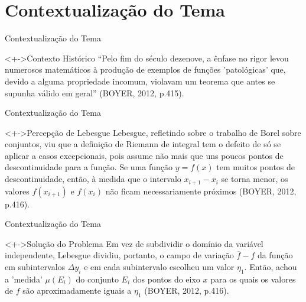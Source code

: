 
\AtBeginSection[]{
	\begin{frame}
		\frametitle{}
		\tableofcontents[currentsection]
	\end{frame}
}


	\section{Contextualização do Tema}
	\begin{frame}{Contextualização do Tema} %
		\begin{block}<+->{Contexto Histórico}
			\justify
			“Pelo fim do século dezenove, a ênfase no rigor levou numerosos matemáticos à produção de exemplos de funções ’patológicas’ que, devido a alguma propriedade incomum, violavam um teorema que antes se supunha válido em geral” (BOYER, 2012, p.415).
		\end{block}
	
	
	
	
	\end{frame} %
	
	\begin{frame}{Contextualização do Tema} %
		\begin{block}<+->{Percepção de Lebesgue}
			\justify
			Lebesgue, refletindo sobre o trabalho de Borel sobre conjuntos, viu que a definição de Riemann de integral tem o defeito de só se aplicar a casos
			excepcionais, pois assume não mais que uns poucos pontos de descontinuidade para a função.
			Se uma função $y = f(x)$ tem muitos pontos de descontinuidade, então, à medida que o intervalo $x_{i+1} - x_i$
			se torna menor, os valores $f(x_{i+1})$ e $f(x_i)$ não ficam
			necessariamente próximos (BOYER, 2012, p.416).
		\end{block}
	\end{frame} %


	\begin{frame}{Contextualização do Tema} %
		\begin{block}<+->{Solução do Problema}
			\justify
			Em vez de subdividir o domínio da variável independente, Lebesgue dividiu, portanto, o campo de variação $\overline{f} - f$ 
			da função em subintervalos $\Delta y_i$ e em cada subintervalo
			escolheu um valor $\eta_1$. 
			Então, achou a 'medida' $\mu(E_i)$ do conjunto $E_i$ dos pontos do eixo $x$ para os
			quais os valores de $f$ são aproximadamente iguais a $\eta_1$ (BOYER, 2012, p.416).
		\end{block}
	\end{frame} %

